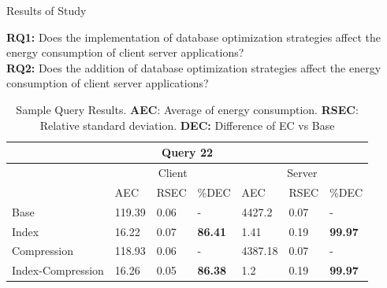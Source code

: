 \documentclass{beamer}
\begin{document}
\small
\begin{frame}{Results of Study}

\textbf{RQ1:} Does the implementation of database optimization strategies affect the energy consumption of client server applications?\\
\textbf{RQ2:} Does the addition of database optimization strategies affect the energy consumption of client server applications?

\scriptsize
\begin{table}[]
\caption{\scriptsize{Sample Query Results. \textbf{AEC}: Average of energy consumption. \textbf{RSEC}: Relative standard deviation. \textbf{DEC:} Difference of EC vs Base }}
\begin{tabular}{|lllllll|}
\hline
\multicolumn{7}{|c|}{Query 22}                                                     \\ \hline
\multicolumn{1}{|l|}{}   & \multicolumn{3}{c|}{Client}                                                          & \multicolumn{3}{c|}{Server}                                      \\ \hline
\multicolumn{1}{|l|}{}   & \multicolumn{1}{l|}{AEC}    & \multicolumn{1}{l|}{RSEC} & \multicolumn{1}{l|}{\%DEC}   & \multicolumn{1}{l|}{AEC}     & \multicolumn{1}{l|}{RSEC} & \%DEC   \\ \hline
\multicolumn{1}{|l|}{Base}  & \multicolumn{1}{l|}{119.39} & \multicolumn{1}{l|}{0.06} & \multicolumn{1}{l|}{-}     & \multicolumn{1}{l|}{4427.2}  & \multicolumn{1}{l|}{0.07} & -     \\ \hline
\multicolumn{1}{|l|}{Index}  & \multicolumn{1}{l|}{16.22}  & \multicolumn{1}{l|}{0.07} & \multicolumn{1}{l|}{\textbf{86.41}} & \multicolumn{1}{l|}{1.41}    & \multicolumn{1}{l|}{0.19} & \textbf{99.97} \\ \hline
\multicolumn{1}{|l|}{Compression}  & \multicolumn{1}{l|}{118.93} & \multicolumn{1}{l|}{0.06} & \multicolumn{1}{l|}{-}     & \multicolumn{1}{l|}{4387.18} & \multicolumn{1}{l|}{0.07} & -     \\ \hline
\multicolumn{1}{|l|}{Index-Compression} & \multicolumn{1}{l|}{16.26}  & \multicolumn{1}{l|}{0.05} & \multicolumn{1}{l|}{\textbf{86.38}} & \multicolumn{1}{l|}{1.2}     & \multicolumn{1}{l|}{0.19} & \textbf{99.97} \\ \hline
\end{tabular}

\end{table}
\end{frame}
\end{document}
